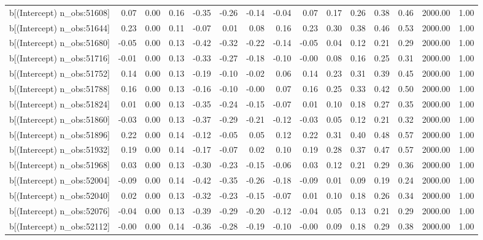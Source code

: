 \begin{table}[ht]
\begin{tabular}{rrrrrrrrrrrrrrr}
  b[(Intercept) n\_obs:51608] & 0.07 & 0.00 & 0.16 & -0.35 & -0.26 & -0.14 & -0.04 & 0.07 & 0.17 & 0.26 & 0.38 & 0.46 & 2000.00 & 1.00 \\ 
  b[(Intercept) n\_obs:51644] & 0.23 & 0.00 & 0.11 & -0.07 & 0.01 & 0.08 & 0.16 & 0.23 & 0.30 & 0.38 & 0.46 & 0.53 & 2000.00 & 1.00 \\ 
  b[(Intercept) n\_obs:51680] & -0.05 & 0.00 & 0.13 & -0.42 & -0.32 & -0.22 & -0.14 & -0.05 & 0.04 & 0.12 & 0.21 & 0.29 & 2000.00 & 1.00 \\ 
  b[(Intercept) n\_obs:51716] & -0.01 & 0.00 & 0.13 & -0.33 & -0.27 & -0.18 & -0.10 & -0.00 & 0.08 & 0.16 & 0.25 & 0.31 & 2000.00 & 1.00 \\ 
  b[(Intercept) n\_obs:51752] & 0.14 & 0.00 & 0.13 & -0.19 & -0.10 & -0.02 & 0.06 & 0.14 & 0.23 & 0.31 & 0.39 & 0.45 & 2000.00 & 1.00 \\ 
  b[(Intercept) n\_obs:51788] & 0.16 & 0.00 & 0.13 & -0.16 & -0.10 & -0.00 & 0.07 & 0.16 & 0.25 & 0.33 & 0.42 & 0.50 & 2000.00 & 1.00 \\ 
  b[(Intercept) n\_obs:51824] & 0.01 & 0.00 & 0.13 & -0.35 & -0.24 & -0.15 & -0.07 & 0.01 & 0.10 & 0.18 & 0.27 & 0.35 & 2000.00 & 1.00 \\ 
  b[(Intercept) n\_obs:51860] & -0.03 & 0.00 & 0.13 & -0.37 & -0.29 & -0.21 & -0.12 & -0.03 & 0.05 & 0.12 & 0.21 & 0.32 & 2000.00 & 1.00 \\ 
  b[(Intercept) n\_obs:51896] & 0.22 & 0.00 & 0.14 & -0.12 & -0.05 & 0.05 & 0.12 & 0.22 & 0.31 & 0.40 & 0.48 & 0.57 & 2000.00 & 1.00 \\ 
  b[(Intercept) n\_obs:51932] & 0.19 & 0.00 & 0.14 & -0.17 & -0.07 & 0.02 & 0.10 & 0.19 & 0.28 & 0.37 & 0.47 & 0.57 & 2000.00 & 1.00 \\ 
  b[(Intercept) n\_obs:51968] & 0.03 & 0.00 & 0.13 & -0.30 & -0.23 & -0.15 & -0.06 & 0.03 & 0.12 & 0.21 & 0.29 & 0.36 & 2000.00 & 1.00 \\ 
  b[(Intercept) n\_obs:52004] & -0.09 & 0.00 & 0.14 & -0.42 & -0.35 & -0.26 & -0.18 & -0.09 & 0.01 & 0.09 & 0.19 & 0.24 & 2000.00 & 1.00 \\ 
  b[(Intercept) n\_obs:52040] & 0.02 & 0.00 & 0.13 & -0.32 & -0.23 & -0.15 & -0.07 & 0.01 & 0.10 & 0.18 & 0.26 & 0.34 & 2000.00 & 1.00 \\ 
  b[(Intercept) n\_obs:52076] & -0.04 & 0.00 & 0.13 & -0.39 & -0.29 & -0.20 & -0.12 & -0.04 & 0.05 & 0.13 & 0.21 & 0.29 & 2000.00 & 1.00 \\ 
  b[(Intercept) n\_obs:52112] & -0.00 & 0.00 & 0.14 & -0.36 & -0.28 & -0.19 & -0.10 & -0.00 & 0.09 & 0.18 & 0.29 & 0.38 & 2000.00 & 1.00 \\ 

\end{tabular}
\end{table}
